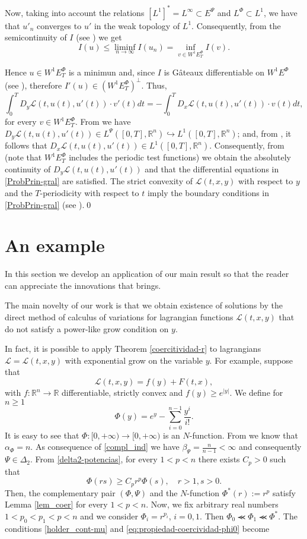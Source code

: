\documentclass[twoside]{elsarticle}
\theoremstyle{remark}
\newcommand{\lphi}{L^{\Phi}}
\newcommand{\lpsi}{L^{\Psi}}
\newcommand{\ephi}{E^{\Phi}}
\newcommand{\wphiet}{W^{1}\ephi_T}
\newcommand{\wphie}{W^{1}\ephi}
\newcommand{\rr}{\mathbb{R}}
\renewcommand{\leq}{\leqslant}
\renewcommand{\geq}{\geqslant}
\newcommand{\epsi}{E^{\Psi}}
\newcounter{example}
\begin{document}
Now, taking into account the relations $\left[L^1\right]^*=L^{\infty}\subset  \epsi$ and $\lphi\subset L^1$, we have that $u'_n$ converges to $u'$ in the weak topology of $L^1$. Consequently,  from the semicontinuity of $I$ (see \cite[Lemma 6.1]{ABGMS2015})  we get
\[I(u)\leq  \liminf_{n\to\infty}I(u_n)=\inf\limits_{v\in\wphie_T}I(v).\]

Hence $u\in \wphiet$ is a minimun and, since $I$ is G\^ateaux differentiable on $\wphie$ (see  \cite[Thm. 3.2]{ABGMS2015}),
therefore $I'(u)\in (\wphiet)^{\perp}$. Thus,
\[\int_0^T D_y\mathcal{L}(t,u(t),u'(t))\cdot v'(t)dt =-\int_0^T D_x\mathcal{L}(t,u(t),u'(t))\cdot v(t)dt,\]
for every  $v\in \wphiet$.
From \cite[Eq. (26)]{ABGMS2015} we have
 $D_y\mathcal{L}(t,u(t),u'(t))\in \lpsi([0,T],\rr^n)\hookrightarrow L^1([0,T],\rr^n)$;
and,  from  \cite[Eq. (24)]{ABGMS2015}, it follows that $D_x\mathcal{L}(t,u(t),u'(t))\in L^1([0,T],\rr^n)$.
Consequently, from \cite[p. 6]{mawhin2010critical}
(note that $\wphiet$  includes the periodic test functions) we obtain the absolutely continuity of $D_y\mathcal{L}(t,u(t),u'(t))$ and that the differential equations in \eqref{ProbPrin-gral} are satisfied. The strict convexity of $\mathcal{L}(t,x,y)$ with respect to $y$ and the $T$-periodicity with respect to $t$ imply the boundary conditions in  \eqref{ProbPrin-gral} (see \cite[Thm. 4.1]{ABGMS2015}).\qed




 \section{An example}\label{sec:examples}

 In this section we develop  an application of our main result
so that the reader can appreciate the innovations that brings.


The main novelty  of our work is that we obtain existence of solutions by the direct method of calculus of variations for lagrangian functions $\mathcal{L}(t,x,y)$ that do not satisfy a power-like grow condition on $y$.

In fact, it is possible to apply Theorem \ref{coercitividad-r} to lagrangians $\mathcal{L}=\mathcal{L}(t,x,y)$ with  exponential grow on the variable $y$. For example, suppose that
  \[\mathcal{L}(t,x,y)=f(y)+F(t,x),\]
with $f:\rr^n\to\rr$ differentiable, strictly convex and $f(y)\geq e^{|y|}$. We define for $n\geq 1$
\[\Phi(y)=e^y-\sum\limits_{i=0}^{n-1}\frac{y^i}{i!}.  \]
It is easy to see that $\Phi:[0,+\infty)\to [0,+\infty)$  is an $N$-function.
From \cite[Ex. 3, p. 85]{M} we know that $\alpha_{\Phi}=n$.
As consequence of \eqref{compl_ind} we have $\beta_{\Psi}=\frac{n}{n-1}<\infty$ and consequently $\Psi\in\Delta_2$.
From \eqref{delta2-potencias}, for every $1<p<n$ there exists $C_p>0$ such that
\[\Phi(rs)\geq C_pr^p\Phi(s),\quad r>1,s>0.\]
Then, the complementary pair $(\Phi,\Psi)$ and the $N$-function $\Phi^*(r):=r^p$ satisfy Lemma \ref{lem_coer} for every $1<p<n$.
Now, we fix arbitrary real numbers $1<p_0<p_1<p<n$ and we consider $\Phi_i=r^{p_i}$, $i=0,1$.
Then $\Phi_0\llcurly \Phi_1\llcurly \Phi^*$.
The conditions  \eqref{holder_cont-mu} and     \eqref{eq:propiedad-coercividad-phi0} become
\end{document}
